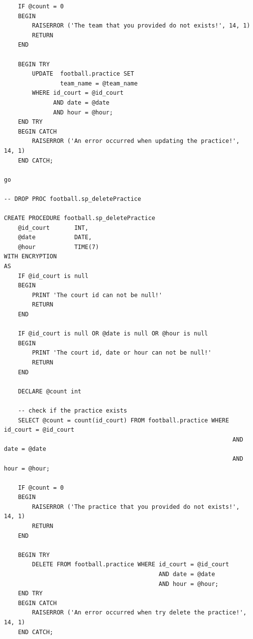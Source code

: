 \documentclass[pdftex,12pt,a4paper]{report}
\begin{document}
\begin{lstlisting}
	IF @count = 0
	BEGIN
		RAISERROR ('The team that you provided do not exists!', 14, 1)
		RETURN
	END

	BEGIN TRY
		UPDATE  football.practice SET
				team_name = @team_name
		WHERE id_court = @id_court
			  AND date = @date
			  AND hour = @hour;
	END TRY
	BEGIN CATCH
		RAISERROR ('An error occurred when updating the practice!', 14, 1)
	END CATCH;

go 

-- DROP PROC football.sp_deletePractice

CREATE PROCEDURE football.sp_deletePractice
	@id_court		INT,
	@date			DATE,
	@hour			TIME(7)
WITH ENCRYPTION
AS 
	IF @id_court is null
	BEGIN
		PRINT 'The court id can not be null!'
		RETURN
	END
	
	IF @id_court is null OR @date is null OR @hour is null
	BEGIN
		PRINT 'The court id, date or hour can not be null!'
		RETURN
	END
	
	DECLARE @count int

	-- check if the practice exists
	SELECT @count = count(id_court) FROM football.practice WHERE id_court = @id_court
																 AND date = @date
																 AND hour = @hour;

	IF @count = 0
	BEGIN
		RAISERROR ('The practice that you provided do not exists!', 14, 1)
		RETURN
	END

	BEGIN TRY
		DELETE FROM football.practice WHERE id_court = @id_court
											AND date = @date
											AND hour = @hour;
	END TRY
	BEGIN CATCH
		RAISERROR ('An error occurred when try delete the practice!', 14, 1)
	END CATCH;
\end{lstlisting}
\end{document}

